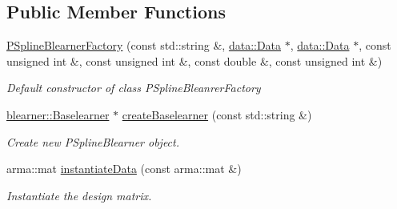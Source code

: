 \subsection*{Public Member Functions}
\begin{DoxyCompactItemize}
\item 
\hyperlink{classblearnerfactory_1_1_p_spline_blearner_factory_ac5218d98736f787d4a2cca8faf317470}{P\+Spline\+Blearner\+Factory} (const std\+::string \&, \hyperlink{classdata_1_1_data}{data\+::\+Data} $\ast$, \hyperlink{classdata_1_1_data}{data\+::\+Data} $\ast$, const unsigned int \&, const unsigned int \&, const double \&, const unsigned int \&)
\begin{DoxyCompactList}\small\item\em Default constructor of class {\ttfamily P\+Spline\+Bleanrer\+Factory} \end{DoxyCompactList}\item 
\hyperlink{classblearner_1_1_baselearner}{blearner\+::\+Baselearner} $\ast$ \hyperlink{classblearnerfactory_1_1_p_spline_blearner_factory_a877072332da418456dcbcb27c572c1e7}{create\+Baselearner} (const std\+::string \&)
\begin{DoxyCompactList}\small\item\em Create new {\ttfamily P\+Spline\+Blearner} object. \end{DoxyCompactList}\item 
arma\+::mat \hyperlink{classblearnerfactory_1_1_p_spline_blearner_factory_a290a1c60224d027059939a895b474aa1}{instantiate\+Data} (const arma\+::mat \&)
\begin{DoxyCompactList}\small\item\em Instantiate the design matrix. \end{DoxyCompactList}\end{DoxyCompactItemize}
